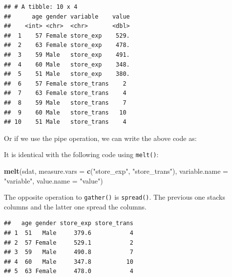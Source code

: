 \documentclass[12pt,]{krantz}
\makeatletter
\newenvironment{Shaded}{\begin{snugshade}}{\end{snugshade}}
\newcommand{\DataTypeTok}[1]{\textcolor[rgb]{0.27,0.27,0.27}{#1}}
\newcommand{\KeywordTok}[1]{\textcolor[rgb]{0.27,0.27,0.27}{\textbf{#1}}}
\newcommand{\NormalTok}[1]{#1}
\newcommand{\OperatorTok}[1]{\textcolor[rgb]{0.43,0.43,0.43}{\textbf{#1}}}
\newcommand{\StringTok}[1]{\textcolor[rgb]{0.5,0.5,0.5}{#1}}
\newenvironment{kframe}{%
\medskip{}
\setlength{\fboxsep}{.8em}
 \def\at@end@of@kframe{}%
 \ifinner\ifhmode%
  \def\at@end@of@kframe{\end{minipage}}%
  \begin{minipage}{\columnwidth}%
 \fi\fi%
 \def\FrameCommand##1{\hskip\@totalleftmargin \hskip-\fboxsep
 \colorbox{shadecolor}{##1}\hskip-\fboxsep
     \hskip-\linewidth \hskip-\@totalleftmargin \hskip\columnwidth}%
 \MakeFramed {\advance\hsize-\width
   \@totalleftmargin\z@ \linewidth\hsize
   \@setminipage}}%
 {\par\unskip\endMakeFramed%
 \at@end@of@kframe}
\renewenvironment{Shaded}{\begin{kframe}}{\end{kframe}}
\makeatother
\begin{document}
\begin{verbatim}
## # A tibble: 10 x 4
##      age gender variable    value
##    <int> <chr>  <chr>       <dbl>
##  1    57 Female store_exp    529.
##  2    63 Female store_exp    478.
##  3    59 Male   store_exp    491.
##  4    60 Male   store_exp    348.
##  5    51 Male   store_exp    380.
##  6    57 Female store_trans    2 
##  7    63 Female store_trans    4 
##  8    59 Male   store_trans    7 
##  9    60 Male   store_trans   10 
## 10    51 Male   store_trans    4
\end{verbatim}

Or if we use the pipe operation, we can write the above code as:

\begin{Shaded}
\end{Shaded}

It is identical with the following code using \texttt{melt()}:

\begin{Shaded}
\begin{Highlighting}[]
\KeywordTok{melt}\NormalTok{(sdat, }\DataTypeTok{measure.vars =} \KeywordTok{c}\NormalTok{(}\StringTok{"store_exp"}\NormalTok{, }\StringTok{"store_trans"}\NormalTok{), }
     \DataTypeTok{variable.name =} \StringTok{"variable"}\NormalTok{, }
     \DataTypeTok{value.name =} \StringTok{"value"}\NormalTok{)}
\end{Highlighting}
\end{Shaded}

The opposite operation to \texttt{gather()} is \texttt{spread()}. The previous one stacks columns and the latter one spread the columns.

\begin{Shaded}
\end{Shaded}

\begin{verbatim}
##   age gender store_exp store_trans
## 1  51   Male     379.6           4
## 2  57 Female     529.1           2
## 3  59   Male     490.8           7
## 4  60   Male     347.8          10
## 5  63 Female     478.0           4
\end{verbatim}
\end{document}
